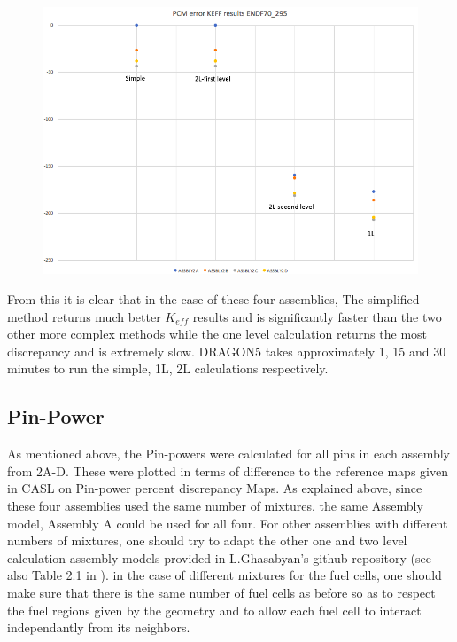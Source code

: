 \documentclass[12pt]{article}
\begin{document}
\begin{figure} [htb!]
\centering
\includegraphics[scale=0.3]{Figures/ENDF70_295.png}
\caption{}
\end{figure}

From this it is clear that in the case of these four assemblies, The simplified method returns much better $K_{eff}$ results and is significantly faster than the two other more complex methods while the one level calculation returns the most discrepancy and is extremely slow. DRAGON5 takes approximately 1, 15 and 30 minutes to run the simple, 1L, 2L calculations respectively.

\subsection{Pin-Power}

As mentioned above, the Pin-powers were calculated for all pins in each assembly from 2A-D. These were plotted in terms of difference to the reference maps given in CASL on Pin-power percent discrepancy Maps. As explained above, since these four assemblies used the same number of mixtures, the same Assembly model, Assembly A could be used for all four. For other assemblies with different numbers of mixtures, one should try to adapt the other one and two level calculation assembly models provided in L.Ghasabyan's github repository \href{https://github.com/tumregels/msca/tree/master/Dragon}{\color{blue}{here}} (see also Table 2.1 in \cite{ghasabyan2020validation}). in the case of different mixtures for the fuel cells, one should make sure that there is the same number of fuel cells as before so as to respect the fuel regions given by the geometry and to allow each fuel cell to interact independantly from its neighbors.
\end{document}
